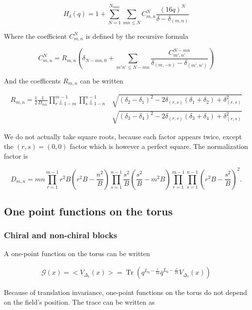 \documentclass[a4paper]{article}
\numberwithin{equation}{section}
\begin{document}
\[
H_{\delta}(q) = 1 + \sum_{N=1}^{N_{max}} \sum_{mn\leq N} C_{m,n}^N \frac{(16q)^N}{\delta-\delta_{(m,n)}}
\]

Where the coefficient \(C_{m,n}^N\) is defined by the recursive formula

\[
C^N_{m,n} = R_{m,n}\left(\delta_{N-mn,0} + \sum_{m'n'\leq N-mn} \frac{C^{N-mn}_{m',n'}}{\delta_{(m,-n)}-\delta_{(m',n')}} \right)
\]

And the coefficents \(R_{m,n}\) can be written

\begin{align}
 R_{m,n} = \frac{1}{2}\frac{1}{D_{mn}}
\prod_{r\overset{2}{=} 1-m}^{m-1}
\prod_{s\overset{2}{=}1-n}^{n-1}
&\sqrt{(\delta_2-\delta_1)^2 -2\delta_{(r,s)}(\delta_1+\delta_2) + \delta_{(r,s)}^2}\nonumber\\
&\sqrt{(\delta_3-\delta_4)^2 -2\delta_{(r,s)}(\delta_3+\delta_4) + \delta_{(r,s)}^2}
\end{align}

We do not actually take square roots, because each factor appears twice, except the \((r,s)=(0,0)\) factor which is however a perfect square. The normalization factor is

\begin{equation}
\label{Dmn}
D_{m,n} = mn \prod_{r=1}^{m-1} r^2B \left(r^2B - \frac{n^2}{B}\right)
\prod_{s=1}^{n-1} \frac{s^2}{B}\left(\frac{s^2}{B} - m^2B\right)
\prod_{r=1}^{m-1} \prod_{s=1}^{n-1} \left(r^2B -\frac{s^2}{B} \right)^2.
\end{equation}
\subsection{One point functions on the torus}
\label{sec:orgf1911a9}

\subsubsection*{Chiral and non-chiral blocks}
\label{sec:orgca8418e}

A one-point function on the torus can be written

\begin{align}
 \mathcal G(x) = <V_{\Delta_1}(x)> = \operatorname{Tr} (q^{L_0-\frac{c}{24}} \bar q^{\bar L_{0}-\frac{c}{24}} V_{\Delta_{1}}(x))
\end{align}

Because of translation invariance, one-point functions on the torus do not depend on the field's position. The trace can be written as
\end{document}
